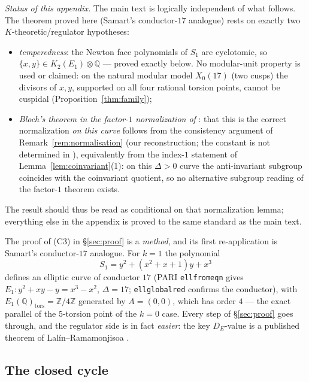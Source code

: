 \documentclass[preprint,12pt]{elsarticle}
\theoremstyle{definition}
\theoremstyle{remark}
\newcommand{\Q}{\mathbb{Q}}
\newcommand{\Z}{\mathbb{Z}}
\begin{document}
\emph{Status of this appendix.} The main text is logically independent of
what follows. The theorem proved here (Samart's conductor-$17$ analogue)
rests on exactly two $K$-theoretic/regulator hypotheses:
\begin{itemize}
  \item \emph{temperedness}: the Newton face polynomials of $S_1$ are
  cyclotomic, so $\{x,y\}\in K_2(E_1)\otimes\Q$ --- proved exactly below.
  No modular-unit property is used or claimed: on the natural modular model
  $X_0(17)$ (two cusps) the divisors of $x,y$, supported on all four
  rational torsion points, cannot be cuspidal
  (Proposition~\ref{thm:family});
  \item \emph{Bloch's theorem in the factor-$1$ normalization of}
  \cite[Thm.~6]{LalinRam}: that this is the correct normalization \emph{on
  this curve} follows from the consistency argument of
  Remark~\ref{rem:normalisation} (our reconstruction; the constant is not
  determined in \cite{LalinRam}), equivalently from the index-$1$ statement
  of Lemma~\ref{lem:coinvariant}(1): on this $\Delta>0$ curve the
  anti-invariant subgroup coincides with the coinvariant quotient, so no
  alternative subgroup reading of the factor-$1$ theorem exists.
\end{itemize}
The result should thus be read as conditional on that normalization lemma;
everything else in the appendix is proved to the same standard as the main
text.

The proof of (C3) in \S\ref{sec:proof} is a \emph{method}, and its first
re-application is Samart's conductor-$17$ analogue. For $k=1$ the polynomial
\[
  S_1=y^2+(x^2+x+1)y+x^3
\]
defines an elliptic curve of conductor $17$ (PARI \texttt{ellfromeqn} gives
$E_1: y^2+xy-y=x^3-x^2$, $\Delta=17$; \texttt{ellglobalred} confirms the
conductor), with $E_1(\Q)_{\mathrm{tors}}=\Z/4\Z$ generated by $A=(0,0)$,
which has order $4$ --- the exact parallel of the $5$-torsion point of the
$k=0$ case. Every step of \S\ref{sec:proof} goes through, and the regulator
side is in fact \emph{easier}: the key $D_E$-value is a published theorem of
Lal\'in--Ramamonjisoa \cite{LalinRam}.

\subsection{The closed cycle}
\end{document}
